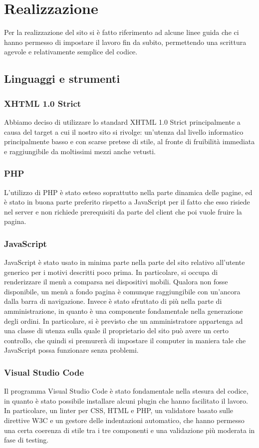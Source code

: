\newpage
\section{Realizzazione}
Per la realizzazione del sito si è fatto riferimento ad alcune linee guida che ci hanno permesso di impostare il lavoro fin da subito, permettendo una scrittura agevole e relativamente semplice del codice.
\subsection{Linguaggi e strumenti}
\subsubsection{XHTML 1.0 Strict}
Abbiamo deciso di utilizzare lo standard XHTML 1.0 Strict principalmente a causa del target a cui il nostro sito si rivolge: un'utenza dal livello informatico principalmente basso e con scarse pretese di stile, al fronte di fruibilità immediata e raggiungibile da moltissimi mezzi anche vetusti.
\subsubsection{PHP}
L'utilizzo di PHP è stato esteso soprattutto nella parte dinamica delle pagine, ed è stato in buona parte preferito rispetto a JavaScript per il fatto che esso risiede nel server e non richiede prerequisiti da parte del client che poi vuole fruire la pagina.
\subsubsection{JavaScript}
JavaScript è stato usato in minima parte nella parte del sito relativo all'utente generico per i motivi descritti poco prima. In particolare, si occupa di renderizzare il menù a comparsa nei dispositivi mobili. Qualora non fosse disponibile, un menù a fondo pagina è comunque raggiungibile con un'ancora dalla barra di navigazione. Invece è stato sfruttato di più nella parte di amministrazione, in quanto è una componente fondamentale nella generazione degli ordini. In particolare, si è previsto che un amministratore appartenga ad una classe di utenza sulla quale il proprietario del sito può avere un certo controllo, che quindi si premurerà di impostare il computer in maniera tale che JavaScript possa funzionare senza problemi.
\subsubsection{Visual Studio Code}
Il programma Visual Studio Code è stato fondamentale nella stesura del codice, in quanto è stato possibile installare alcuni plugin che hanno facilitato il lavoro. In particolare, un linter per CSS, HTML e PHP, un validatore basato sulle direttive W3C e un gestore delle indentazioni automatico, che hanno permesso una certa coerenza di stile tra i tre componenti e una validazione più moderata in fase di testing.
